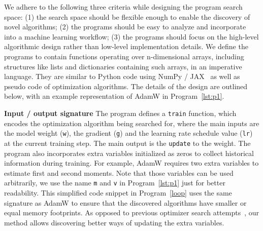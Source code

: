 \documentclass{article}
\begin{document}
We adhere to the following three criteria while designing the program search space: (1) the search space should be flexible enough to enable the discovery of novel algorithms; (2) the programs should be easy to analyze and incorporate into a machine learning workflow; (3) the programs should focus on the high-level algorithmic design rather than low-level implementation details. We define the programs to contain functions operating over n-dimensional arrays, including structures like lists and dictionaries containing such arrays, in an imperative language. They are similar to Python code using NumPy / JAX~\citep{harris2020array, jax2018github} as well as pseudo code of optimization algorithms. The details of the design are outlined below, with an example representation of AdamW in Program~\ref{lst:p1}.


\textbf{Input / output signature} 
The program defines a \verb|train| function, which encodes the optimization algorithm being searched for, where the main inputs are the model weight (\texttt{w}), the gradient (\texttt{g}) and the learning rate schedule value (\texttt{lr}) at the current training step.
The main output is the \texttt{update} to the weight. The program also incorporates extra variables initialized as zeros to collect historical information during training.
For example, AdamW requires two extra variables to estimate first and second moments. Note that those variables can be used arbitrarily, we use the name \texttt{m} and \texttt{v} in Program~\ref{lst:p1} just for better readability.
This simplified code snippet in Program~\ref{loop} uses the same signature as AdamW to ensure that the discovered algorithms have smaller or equal memory footprints.
As opposed to previous optimizer search attempts~\citep{bello2017nos, wang2022efficient}, our method allows discovering better ways of updating the extra variables.


\end{document}
